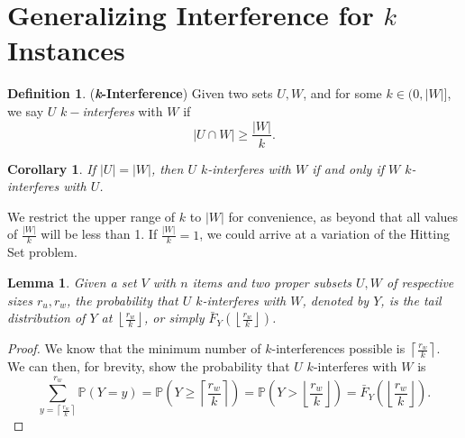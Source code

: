\documentclass[10pt]{extarticle}
\newtheorem{lemma}[theorem]{Lemma}
\newtheorem{corollary}[theorem]{Corollary}
\theoremstyle{definition}
\newtheorem{definition}[theorem]{Definition}
\begin{document}
\section{Generalizing Interference for $k$ Instances}

\begin{definition}
    (\textbf{\textit{k}-Interference}) Given two sets $U, W$, and for some $k \in (0,|W|]$, we say $U$ $k-$\textit{interferes} with $W$ if 
    \begin{equation}
        |U \cap W| \ge  \frac{|W|}{k}.
    \end{equation}
\end{definition}

\begin{corollary}
\label{collorary:k-int-equals}
    If $|U| = |W|$, then $U$ $k$-interferes with $W$ if and only if $W$ $k$-interferes with $U$.
\end{corollary}

We restrict the upper range of $k$ to $|W|$ for convenience, as beyond that all values of $\frac{|W|}{k}$ will be less than 1. If $\frac{|W|}{k} = 1$, we could arrive at a variation of the Hitting Set problem. 


\begin{lemma}
\label{lemma:k-int-prob}
    Given a set $V$ with $n$ items and two proper subsets $U,W$ of respective sizes $r_u,r_w$, the probability that $U$ $k$-interferes with $W$, denoted by $Y$, is the tail distribution of $Y$ at $\left\lfloor \frac{r_w}{k} \right\rfloor$, or simply $\bar{F}_Y\left(\left\lfloor \frac{r_w}{k} \right\rfloor\right)$.
\end{lemma}
\begin{proof}
    We know that the minimum number of $k$-interferences possible is $\left\lceil \frac{r_w}{k} \right\rceil$. We can then, for brevity, show the probability that $U$ $k$-interferes with $W$ is
    \begin{equation}
        \sum_{y = \left\lceil \frac{r_w}{k} \right\rceil}^{r_w} \mathbb{P}(Y=y) = \mathbb{P}\left(Y \geq \left\lceil \frac{r_w}{k} \right\rceil\right) = \mathbb{P}\left(Y > \left\lfloor \frac{r_w}{k} \right\rfloor\right) = \bar{F}_Y\left(\left\lfloor \frac{r_w}{k} \right\rfloor\right).
    \end{equation}
\end{proof}
\end{document}
